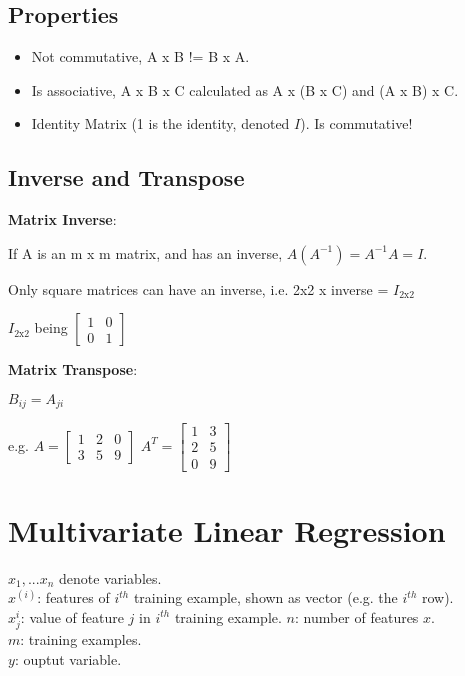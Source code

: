 \documentclass[12pt, a4paper]{article}
\begin{document}
  \newpage

  \subsection{Properties}

    \begin{itemize}
      \item Not commutative, A x B != B x A.
      \item Is associative, A x B x C calculated as A x (B x C) and
        (A x B) x C.
      \item Identity Matrix (1 is the identity, denoted $I$). 
        Is commutative!
    \end{itemize}		    

  \subsection{Inverse and Transpose}

    \textbf{Matrix Inverse}:

    If A is an m x m matrix, and has an inverse,
    $A(A^{-1}) = A^{-1} A = I$.		  

    Only square matrices can have an inverse, i.e. 2x2 x inverse = 
    $I_{\text{2x2}}$

    $I_{\text{2x2}}$ being $\begin{bmatrix} 1 & 0 \\ 0 & 1 \end{bmatrix}$

    \textbf{Matrix Transpose}:

    $B_{ij} = A_{ji}$

    e.g. 
    $A = \begin{bmatrix} 1 & 2 & 0 \\ 3 & 5 & 9 \end{bmatrix}$
    $A^T = \begin{bmatrix} 1 & 3 \\ 2 & 5 \\ 0 & 9 \end{bmatrix}$	    

  \newpage

\section{Multivariate Linear Regression}

  $x_1,... x_n$ denote variables.\\
  $x^{(i)}$: features of $i^{th}$ training example, shown as vector 
      (e.g. the $i^{th}$ row).\\
  $x_j^{i}$: value of feature $j$ in $i^{th}$ training example.
  $n$: number of features $x$.\\
  $m$: training examples.\\
  $y$: ouptut variable.\\
\end{document}
